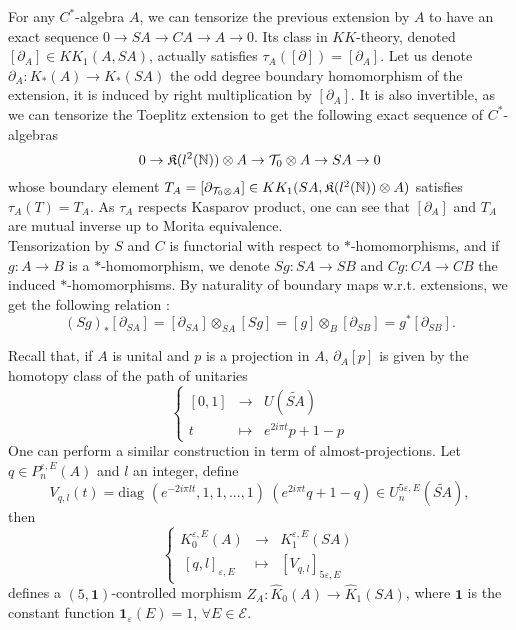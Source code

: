 For any $C^*$-algebra $A$, we can tensorize the previous extension by $A$ to have an exact sequence $0\rightarrow SA \rightarrow CA \rightarrow A \rightarrow  0 $. Its class in $KK$-theory, denoted $[\partial_{A}]\in KK_1(A,SA)$, actually satisfies $\tau_A([\partial ]) =[\partial_{A}]$. Let us denote $\partial_A : K_*(A)\rightarrow K_*(SA)$ the odd degree boundary homomorphism of the extension, it is induced by right multiplication by $[\partial_A]$. It is also invertible, as we can tensorize the Toeplitz extension to get the following exact sequence of $C^*$-algebras
\[0\rightarrow \mathfrak K(l^2(\mathbb N))\otimes A \rightarrow \mathcal T_0 \otimes A \rightarrow SA \rightarrow 0 \]
whose boundary element $T_A =[\partial_{\mathcal T_0 \otimes A }]\in KK_1(SA,\mathfrak K(l^2(\mathbb N))\otimes A)$ satisfies $\tau_A(T)= T_A$. As $\tau_A$ respects Kasparov product, one can see that $[\partial_A]$ and $T_A$ are mutual inverse up to Morita equivalence.\\

Tensorization by $S$ and $C$ is functorial with respect to $*$-homomorphisms, and if $g : A\rightarrow B$ is a $*$-homomorphism, we denote $Sg : SA\rightarrow SB$ and $Cg : CA\rightarrow CB$ the induced $*$-homomorphisms. By naturality of boundary maps w.r.t. extensions, we get the following relation :
\[(Sg)_*[\partial_{SA}] = [\partial_{SA}]\otimes_{SA} [Sg] = [g]\otimes_{B} [\partial_{SB}] = g^*[\partial_{SB}] .\]


Recall that, if $A$ is unital and $p$ is a projection in $A$, $\partial_A [p]$ is given by the homotopy class of the path of unitaries 
\[\left\{\begin{array}{rcl} [0,1] & \rightarrow & U(\tilde{SA}) \\ t & \mapsto & e^{2i\pi t}p + 1-p\end{array}\right.\]
One can perform a similar construction in term of almost-projections. Let $q\in P_n^{\varepsilon,E}(A)$ and $l$ an integer, define 
\[V_{q,l}(t) = \text{diag }(e^{-2i\pi l t}, 1, 1,...,1) \ (e^{2i\pi t}q +1-q)\in U^{5\varepsilon,E}_n(\tilde{SA}),\]
then 
\[\left\{\begin{array}{rcl} 
K_0^{\varepsilon,E}(A) & \rightarrow & K_1^{\varepsilon,E}(SA) \\ 
\ [q,l]_{\varepsilon,E} & \mapsto & [V_{q,l}]_{5\varepsilon,E}
\end{array}\right.\]
defines a $(5,\textbf{1})$-controlled morphism $Z_A : \hat K_0(A)\rightarrow \hat K_1(SA)$, where $\textbf{1}$ is the constant function $\textbf{1}_\varepsilon(E) = 1$, $\forall E\in\mathcal E$.

